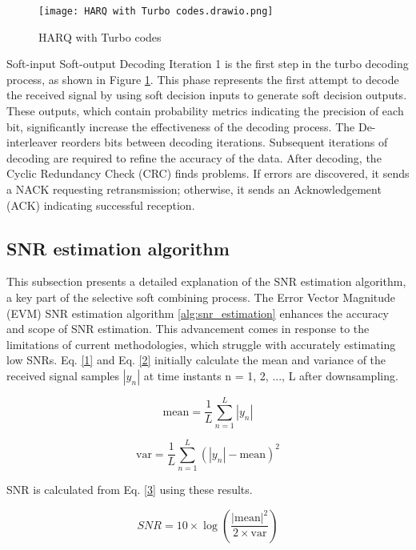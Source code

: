 \documentclass[sn-mathphys-num]{sn-jnl}
\theoremstyle{thmstyleone}
\theoremstyle{thmstyletwo}%
\theoremstyle{thmstylethree}%
\begin{document}
\begin{figure}[H]
    \centering
    \texttt{[image: HARQ with Turbo codes.drawio.png]}
    \caption{HARQ with Turbo codes}
    \label{fig:15}
\end{figure}

Soft-input Soft-output Decoding Iteration 1 is the first step in the turbo decoding process, as shown in Figure \ref{fig:15}. This phase represents the first attempt to decode the received signal by using soft decision inputs to generate soft decision outputs. These outputs, which contain probability metrics indicating the precision of each bit, significantly increase the effectiveness of the decoding process. The De-interleaver reorders bits between decoding iterations. Subsequent iterations of decoding are required to refine the accuracy of the data. After decoding, the Cyclic Redundancy Check (CRC) finds problems. If errors are discovered, it sends a NACK requesting retransmission; otherwise, it sends an Acknowledgement (ACK) indicating successful reception.

\subsection{SNR estimation algorithm} \label{s3.1}

This subsection presents a detailed explanation of the SNR estimation algorithm, a key part of the selective soft combining process. The Error Vector Magnitude (EVM) SNR estimation algorithm \ref{alg:snr_estimation} enhances the accuracy and scope of SNR estimation. This advancement comes in response to the limitations of current methodologies, which struggle with accurately estimating low SNRs. Eq. \ref{1} and Eq. \ref{2} initially calculate the mean and variance of the received signal samples $|y_n|$ at time instants n = 1, 2, ..., L after downsampling.

\begin{equation}\label{1} 
\text{mean} = \frac{1}{L} \sum_{n=1}^{L} |y_n|
\end{equation}

\begin{equation}\label{2} 
\text{var} = \frac{1}{L} \sum_{n=1}^{L}( |y_n| -\text{mean})^2
\end{equation}

SNR is calculated from Eq. \ref{3} \cite{r20} using these results.

\begin{equation}\label{3} SNR = 10 \times \log\left(\frac{|\text{mean}|^2}{2 \times \text{var}}\right) \end{equation}
\end{document}
